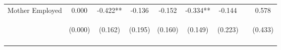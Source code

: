 \begin{tabular}{lcccccccc}
\noalign{\smallskip}Mother Employed & 0.000 & -0.422** & -0.136 & -0.152 & -0.334** & -0.144 &  & 0.578\\
 & \begin{footnotesize}(0.000)\end{footnotesize} & \begin{footnotesize}(0.162)\end{footnotesize} & \begin{footnotesize}(0.195)\end{footnotesize} & \begin{footnotesize}(0.160)\end{footnotesize} & \begin{footnotesize}(0.149)\end{footnotesize} & \begin{footnotesize}(0.223)\end{footnotesize} & \begin{footnotesize}\end{footnotesize} & \begin{footnotesize}(0.433)\end{footnotesize}\\
\noalign{\smallskip}\hline\end{tabular}\\

